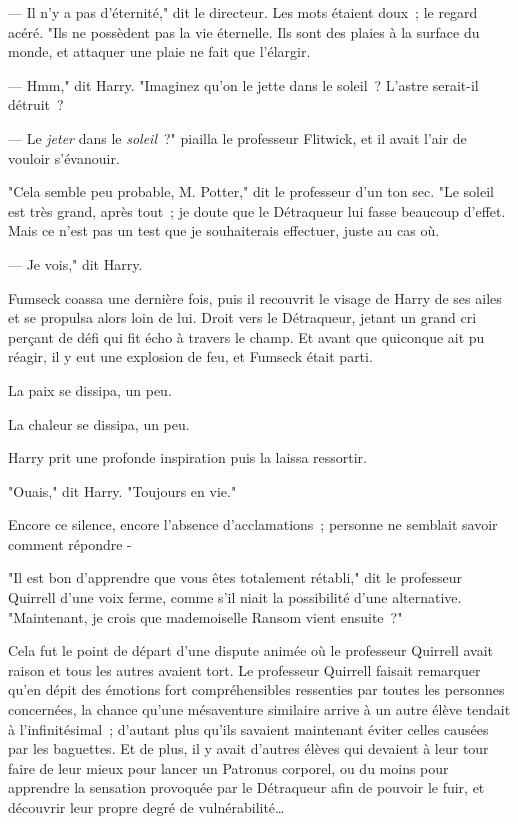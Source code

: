 --- Il n'y a pas d'éternité," dit le directeur. Les mots étaient doux~; le regard acéré. "Ils ne possèdent pas la vie éternelle. Ils sont des plaies à la surface du monde, et attaquer une plaie ne fait que l'élargir.

--- Hmm," dit Harry. "Imaginez qu'on le jette dans le soleil~? L'astre serait-il détruit~?

--- Le \emph{jeter} dans le \emph{soleil}~?" piailla le professeur Flitwick, et il avait l'air de vouloir s'évanouir.

"Cela semble peu probable, M. Potter," dit le professeur d'un ton sec. "Le soleil est très grand, après tout~; je doute que le Détraqueur lui fasse beaucoup d'effet. Mais ce n'est pas un test que je souhaiterais effectuer, juste au cas où.

--- Je vois," dit Harry.

Fumseck coassa une dernière fois, puis il recouvrit le visage de Harry de ses ailes et se propulsa alors loin de lui. Droit vers le Détraqueur, jetant un grand cri perçant de défi qui fit écho à travers le champ. Et avant que quiconque ait pu réagir, il y eut une explosion de feu, et Fumseck était parti.

La paix se dissipa, un peu.

La chaleur se dissipa, un peu.

Harry prit une profonde inspiration puis la laissa ressortir.

"Ouais," dit Harry. "Toujours en vie."

Encore ce silence, encore l'absence d'acclamations~; personne ne semblait savoir comment répondre -

"Il est bon d'apprendre que vous êtes totalement rétabli," dit le professeur Quirrell d'une voix ferme, comme s'il niait la possibilité d'une alternative. "Maintenant, je crois que mademoiselle Ransom vient ensuite~?"

Cela fut le point de départ d'une dispute animée où le professeur Quirrell avait raison et tous les autres avaient tort. Le professeur Quirrell faisait remarquer qu'en dépit des émotions fort compréhensibles ressenties par toutes les personnes concernées, la chance qu'une mésaventure similaire arrive à un autre élève tendait à l'infinitésimal~; d'autant plus qu'ils savaient maintenant éviter celles causées par les baguettes. Et de plus, il y avait d'autres élèves qui devaient à leur tour faire de leur mieux pour lancer un Patronus corporel, ou du moins pour apprendre la sensation provoquée par le Détraqueur afin de pouvoir le fuir, et découvrir leur propre degré de vulnérabilité…

